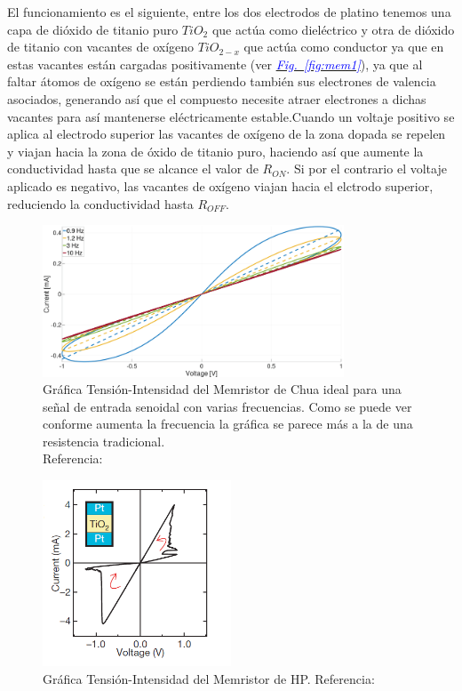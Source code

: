 \documentclass[12pt,a4paper]{report} %
\newcommand{\fref}[1]{\hyperref[#1]{\textcolor{blue}{\textit{Fig.~\ref*{#1}}}}}
\begin{document}
	El funcionamiento es el siguiente, entre los dos electrodos de platino tenemos una capa de dióxido de titanio puro $TiO_2$ que actúa como dieléctrico y otra de dióxido de titanio con vacantes de oxígeno $TiO_{2-x}$ que actúa como conductor ya que en estas vacantes están cargadas positivamente (ver \fref{fig:mem1}), ya que al faltar átomos de oxígeno se están perdiendo también sus electrones de valencia asociados, generando así que el compuesto necesite atraer electrones a dichas vacantes para así mantenerse eléctricamente estable.Cuando un voltaje positivo se aplica al electrodo superior las vacantes de oxígeno de la zona dopada se repelen y viajan hacia la zona de óxido de titanio puro, haciendo así que aumente la conductividad hasta que se alcance el valor de $R_{ON}$. Si por el contrario el voltaje aplicado es negativo, las vacantes de oxígeno viajan hacia el elctrodo superior, reduciendo la conductividad hasta $R_{OFF}$.
	
	\begin{figure}[h]
		\centering
		\includegraphics[width=0.8\textwidth]{iv_chua.png}
		\caption{Gráfica Tensión-Intensidad del Memristor de Chua ideal para una señal de entrada senoidal con varias frecuencias. Como se puede ver conforme aumenta la frecuencia la gráfica se parece más a la de una resistencia tradicional. \\ Referencia: \cite{outsiders}}
		\label{fig:iv_chua}
	\end{figure}\smallskip
	
		\begin{figure}[h]
		\centering
		\includegraphics[width=0.5\textwidth]{iv_hp.png}
		\caption{Gráfica Tensión-Intensidad del Memristor de HP. Referencia: \cite{HP}}
		\label{fig:iv_hp}
	\end{figure}\smallskip
	
\end{document}
